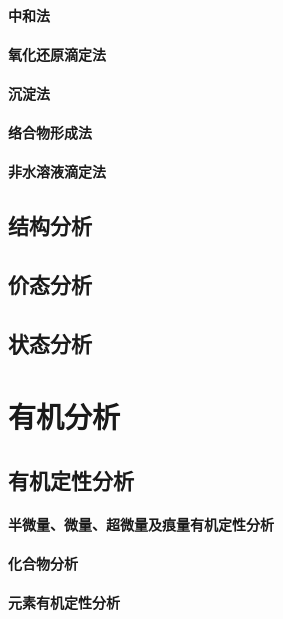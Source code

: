 \documentclass[UTF8]{../03-Chemistry}
\begin{document}
    \subsubsection{中和法}
    \subsubsection{氧化还原滴定法}
    \subsubsection{沉淀法}
    \subsubsection{络合物形成法}
    \subsubsection{非水溶液滴定法}
\section{结构分析}
\section{价态分析}
\section{状态分析}








\chapter{有机分析}
\section{有机定性分析}
    \subsubsection{半微量、微量、超微量及痕量有机定性分析}
    \subsubsection{化合物分析}
    \subsubsection{元素有机定性分析}
\end{document}

